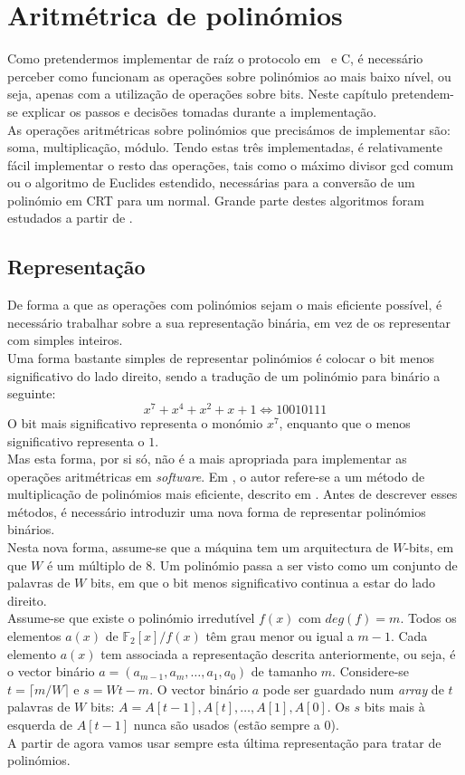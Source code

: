 \section{Aritmétrica de polinómios}
Como pretendermos implementar de raíz o protocolo em \sage\ e \textsf{C}, é necessário perceber como funcionam as operações sobre polinómios ao mais baixo nível, ou seja, apenas com a utilização de operações sobre bits. Neste capítulo pretendem-se explicar os passos e decisões tomadas durante a implementação.\\
As operações aritmétricas sobre polinómios que precisámos de implementar são: soma, multiplicação, módulo. Tendo estas três implementadas, é relativamente fácil implementar o resto das operações, tais como o máximo divisor \textsf{gcd} comum ou o algoritmo de Euclides estendido, necessárias para a conversão de um polinómio em CRT para um normal. Grande parte destes algoritmos foram estudados a partir de \cite{Hankerson:2003:GEC:940321}.\\
\subsection{Representação}
De forma a que as operações com polinómios sejam o mais eficiente possível, é necessário trabalhar sobre a sua representação binária, em vez de os representar com simples inteiros.\\
Uma forma bastante simples de representar polinómios é colocar o bit menos significativo do lado direito, sendo a tradução de um polinómio para binário a seguinte:
$$
x^7 + x^4 + x^2 + x + 1 \Leftrightarrow 1 0 0 1 0 1 1 1
$$
O bit mais significativo representa o monómio $x^7$, enquanto que o menos significativo representa o $1$.\\
Mas esta forma, por si só, não é a mais apropriada para implementar as operações aritmétricas em \textit{software}. Em \cite{lapin}, o autor refere-se a um método de multiplicação de polinómios mais eficiente, descrito em \cite{Hankerson:2003:GEC:940321}. Antes de descrever esses métodos, é necessário introduzir uma nova forma de representar polinómios binários.\\
Nesta nova forma, assume-se que a máquina tem um arquitectura de $W$-bits, em que $W$ é um múltiplo de 8. Um polinómio passa a ser visto como um conjunto de palavras de $W$ bits, em que o bit menos significativo continua a estar do lado direito.\\
Assume-se que existe o polinómio irredutível $f(x)$ com $deg(f) = m$. Todos os elementos $a(x)$ de $\mathbb{F}_2[x]/f(x)$ têm grau menor ou igual a $m-1$. Cada elemento $a(x)$ tem associada a representação descrita anteriormente, ou seja, é o vector binário $a = (a_{m-1}, a_m, \dotsc, a_1, a_0)$ de tamanho $m$. Considere-se $t = \lceil m/W \rceil$ e $s = Wt - m$. O vector binário $a$ pode ser guardado num \textit{array} de $t$ palavras de $W$ bits: $A = A[t-1], A[t], \dotsc, A[1], A[0]$. Os $s$ bits mais à esquerda de $A[t-1]$ nunca são usados (estão sempre a 0).\\
A partir de agora vamos usar sempre esta última representação para tratar de polinómios.\\
